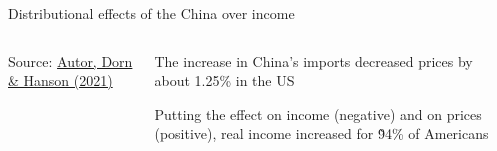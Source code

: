 \documentclass[notes,11pt, aspectratio=169, xcolor=table]{beamer}
\newenvironment{wideitemize}{\itemize\addtolength{\itemsep}{10pt}}{\enditemize}
\begin{document}
\begin{frame}{Distributional effects of the China over income}


\begin{columns}[T] %
\begin{column}{.65\textwidth}
\centering
    \vspace{12pt}
    { \scriptsize
    Source: \href{https://www.nber.org/system/files/working_papers/w29401/w29401.pdf}{Autor, Dorn \& Hanson (2021)}
    }
\end{column}%
\hfill%
\begin{column}{.35\textwidth}
{\small
\begin{wideitemize}

    \item The increase in China's imports decreased prices by about  1.25\% in the US

    \item Putting the effect on income (negative) and on prices (positive), real income increased for \~94\% of Americans

    
\end{wideitemize}
}
\end{column}%
\end{columns}

\end{frame}
\end{document}
